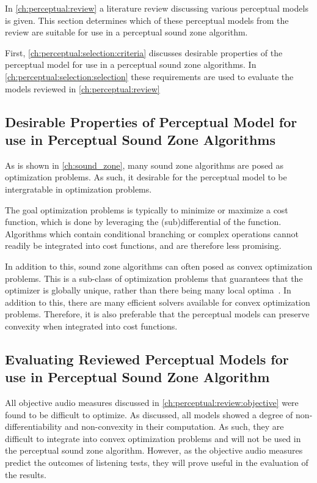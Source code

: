 In \autoref{ch:perceptual:review} a literature review discussing various perceptual models is given.
This section determines which of these perceptual models from the review are suitable for use in a perceptual sound zone algorithm.

First, \autoref{ch:perceptual:selection:criteria} discusses desirable properties of the perceptual model for use in a perceptual sound zone algorithms. 
In \autoref{ch:perceptual:selection:selection} these requirements are used to evaluate the models reviewed in \autoref{ch:perceptual:review}

\subsection{Desirable Properties of Perceptual Model for use in Perceptual Sound Zone Algorithms}
\label{ch:perceptual:selection:criteria}
As is shown in \autoref{ch:sound_zone}, many sound zone algorithms are posed as optimization problems.
As such, it desirable for the perceptual model to be intergratable in optimization problems.

The goal optimization problems is typically to minimize or maximize a cost function, which is done by leveraging the (sub)differential of the function.
Algorithms which contain conditional branching or complex operations cannot readily be integrated into cost functions, and are therefore less 
promising.

In addition to this, sound zone algorithms can often posed as convex optimization problems.
This is a sub-class of optimization problems that guarantees that the optimizer is globally unique, 
rather than there being many local optima~\cite{boyd2004convex}. 
In addition to this, there are many efficient solvers available for convex optimization problems.
Therefore, it is also preferable that the perceptual models can preserve convexity when integrated into cost functions.


\subsection{Evaluating Reviewed Perceptual Models for use in Perceptual Sound Zone Algorithm}
\label{ch:perceptual:selection:selection}
All objective audio measures discussed in \autoref{ch:perceptual:review:objective} were found to be difficult to optimize. 
As discussed, all models showed a degree of non-differentiability and non-convexity in their computation.
As such, they are difficult to integrate into convex optimization problems and will not be used in the perceptual sound zone algorithm.
However, as the objective audio measures predict the outcomes of listening tests, they will prove useful in the evaluation of
the results.


